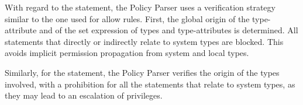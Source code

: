 With regard to the \typeattributeset statement, the \seapp Policy Parser
uses a verification strategy similar to the one used for allow rules.
First, the global origin of the type-attribute and of the set
expression of types and type-attributes is determined.  All statements
that directly or indirectly relate to system types are blocked.  This
avoids implicit permission propagation from system and local types.

Similarly, for the \typetransition statement, the \seapp Policy Parser
verifies the origin of the types involved, with a prohibition for all
the statements that relate to system types, as they may lead to an
escalation of privileges.


